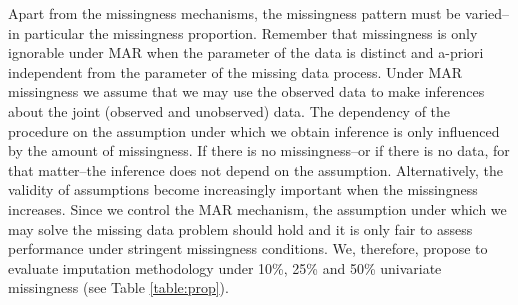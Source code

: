\documentclass[bimj,fleqn]{w-art}
\begin{document}
Apart from the missingness mechanisms, the missingness pattern must be varied--in particular the missingness proportion. Remember that missingness is only ignorable under MAR when the parameter of the data is distinct and a-priori independent from the parameter of the missing data process. Under MAR missingness we assume that we may use the observed data to make inferences about the joint (observed and unobserved) data. The dependency of the procedure on the assumption under which we obtain inference is only influenced by the amount of missingness. If there is no missingness--or if there is no data, for that matter--the inference does not depend on the assumption. Alternatively, the validity of assumptions become increasingly important when the missingness increases. Since we control the MAR mechanism, the assumption under which we may solve the missing data problem should hold and it is only fair to assess performance under stringent missingness conditions. We, therefore, propose to evaluate imputation methodology under 10\%, 25\% and 50\% univariate missingness (see Table \ref{table:prop}). %
\end{document}
